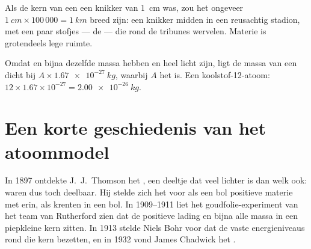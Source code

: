 \begin{example}\label{ex:g9:inside-the-atom:marble}
Als de kern van een  een knikker van \qty{1}{cm} was, zou het 
ongeveer $\qty{1}{cm} \times 100\,000 = \qty{1}{km}$ breed zijn: een
knikker midden in een reusachtig stadion, met een paar stofjes --- de
 --- die rond de tribunes wervelen. Materie is grotendeels
lege ruimte.
\end{example}

\begin{method}\label{met:g9:inside-the-atom:mass}
Omdat  en  bijna dezelfde massa hebben en 
heel licht zijn, ligt de massa van een  dicht bij $A \times
\qty{1.67e-27}{kg}$, waarbij $A$ het  is. Een koolstof-12-atoom:
$12 \times 1.67 \times 10^{-27} = \qty{2.00e-26}{kg}$.
\end{method}

\section{Een korte geschiedenis van het atoommodel}

\begin{history}
In 1897 ontdekte J.~J.~Thomson het , een deeltje dat veel lichter
is dan welk  ook:  waren dus toch deelbaar. Hij stelde zich
het  voor als een bol positieve materie met  erin, als
krenten in een bol. In 1909--1911 liet het goudfolie-experiment van het
team van Rutherford zien dat de positieve lading en bijna alle massa in
een piepkleine kern zitten. In 1913 stelde Niels Bohr voor dat de
 vaste energieniveaus rond die kern bezetten, en in 1932 vond
James Chadwick het .
\end{history}

